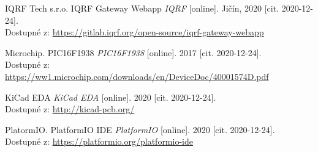 \documentclass[12pt]{article}
\begin{document}
\begin{thebibliography}{99}
IQRF Tech s.r.o. IQRF Gateway Webapp \emph{IQRF} [online]. Jičín, 2020 [cit. 2020-12-24]. \\ Dostupné z: \url{https://gitlab.iqrf.org/open-source/iqrf-gateway-webapp}

Microchip. PIC16F1938 \emph{PIC16F1938} [online]. 2017 [cit. 2020-12-24]. \\ Dostupné z: \url{https://ww1.microchip.com/downloads/en/DeviceDoc/40001574D.pdf}

KiCad EDA \emph{KiCad EDA} [online]. 2020 [cit. 2020-12-24]. \\ Dostupné z: \url{http://kicad-pcb.org/}

PlatormIO. PlatformIO IDE \emph{PlatformIO} [online]. 2020 [cit. 2020-12-24]. \\ Dostupné z: \url{https://platformio.org/platformio-ide}


\end{thebibliography}
\end{document}
